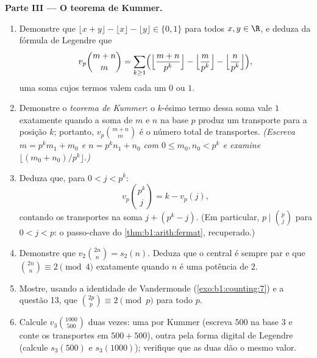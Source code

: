 \begin{problem}
\medskip
\noindent\textbf{Parte III --- O teorema de Kummer.}
\begin{enumerate}
  \item Demonstre que $\lfloor x + y \rfloor - \lfloor x \rfloor -
        \lfloor y \rfloor \in \{0, 1\}$ para todos $x, y \in \R$, e
        deduza da fórmula de Legendre que
        \[
        v_p\binom{m+n}m
        = \sum_{k\geq1}\Bigl(
        \Bigl\lfloor\frac{m+n}{p^k}\Bigr\rfloor
        - \Bigl\lfloor\frac{m}{p^k}\Bigr\rfloor
        - \Bigl\lfloor\frac{n}{p^k}\Bigr\rfloor\Bigr),
        \]
        uma soma cujos termos valem cada um $0$ ou $1$.
  \item Demonstre o \emph{teorema de Kummer}: o $k$-ésimo termo dessa
        soma vale $1$ exatamente quando a soma de $m$ e $n$ na
        base $p$ produz um transporte para a posição $k$; portanto,
        $v_p\binom{m+n}m$ é o número total de transportes.
        \emph{(Escreva $m = p^km_1 + m_0$ e $n = p^kn_1 + n_0$
        com $0 \leq m_0, n_0 < p^k$ e examine $\lfloor (m_0 +
        n_0)/p^k \rfloor$.)}
  \item Deduza que, para $0 < j < p^k$:
        \[
        v_p\binom{p^k}{j} = k - v_p(j) ,
        \]
        contando os transportes na soma $j + (p^k - j)$.
        (Em particular, $p \mid \binom p j$ para $0 < j < p$: o
        passo-chave do \cref{thm:b1:arith:fermat}, recuperado.)
  \item Demonstre que $v_2\binom{2n}n = s_2(n)$. Deduza que o
         central é sempre par e que
        $\binom{2n}n \equiv 2 \pmod 4$ exatamente quando $n$ é uma potência
        de $2$.
  \item Mostre, usando a identidade de Vandermonde
        (\cref{exo:b1:counting:7}) e a questão 13, que
        $\binom{2p}p \equiv 2 \pmod p$ para todo  $p$.
  \item Calcule $v_3\binom{1000}{500}$ duas vezes: uma por Kummer
        (escreva $500$ na base $3$ e conte os transportes em $500 +
        500$), outra pela forma digital de Legendre (calcule $s_3(500)$
        e $s_3(1000)$); verifique que as duas dão o mesmo valor.
\end{enumerate}


\end{problem}
